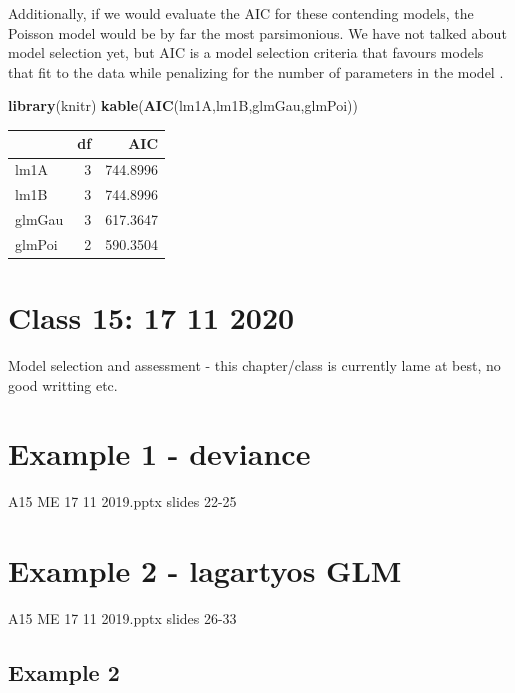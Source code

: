 \documentclass[
]{book}
\newenvironment{Shaded}{\begin{snugshade}}{\end{snugshade}}
\newcommand{\KeywordTok}[1]{\textcolor[rgb]{0.13,0.29,0.53}{\textbf{#1}}}
\newcommand{\NormalTok}[1]{#1}
\begin{document}
Additionally, if we would evaluate the AIC for these contending models, the Poisson model would be by far the most parsimonious. We have not talked about model selection yet, but AIC is a model selection criteria that favours models that fit to the data while penalizing for the number of parameters in the model \citep[e.g.~][]{Aho2014}.

\begin{Shaded}
\begin{Highlighting}[]
\KeywordTok{library}\NormalTok{(knitr)}
\KeywordTok{kable}\NormalTok{(}\KeywordTok{AIC}\NormalTok{(lm1A,lm1B,glmGau,glmPoi))}
\end{Highlighting}
\end{Shaded}

\begin{tabular}{l|r|r}
\hline
  & df & AIC\\
\hline
lm1A & 3 & 744.8996\\
\hline
lm1B & 3 & 744.8996\\
\hline
glmGau & 3 & 617.3647\\
\hline
glmPoi & 2 & 590.3504\\
\hline
\end{tabular}

\hypertarget{aula15}{%
\chapter{Class 15: 17 11 2020}\label{aula15}}

Model selection and assessment - this chapter/class
is currently lame at best, no good writting etc.

\hypertarget{example-1---deviance}{%
\chapter{Example 1 - deviance}\label{example-1---deviance}}

A15 ME 17 11 2019.pptx
slides 22-25

\hypertarget{example-2---lagartyos-glm}{%
\chapter{Example 2 - lagartyos GLM}\label{example-2---lagartyos-glm}}

A15 ME 17 11 2019.pptx
slides 26-33

\hypertarget{example-2}{%
\section{Example 2}\label{example-2}}
\end{document}
